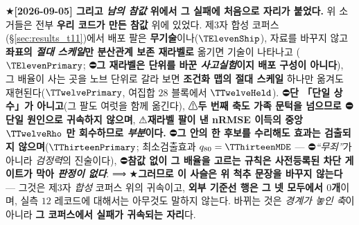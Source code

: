 \documentclass[11pt]{report}
\numberwithin{equation}{chapter}
\numberwithin{figure}{chapter}
\numberwithin{table}{chapter}
\begin{document}
★\textbf{[2026-09-05] 그리고 \emph{남의 참값} 위에서 그 실패에 처음으로 자리가 붙었다.}
위 소거들은 전부 \textbf{우리 코드가 만든 참값} 위에 있었다. 제3자 합성 코퍼스
(\S\ref{sec:results_t11})에서 배포 팔은 \textbf{무기술}이나($\TElevenShip$), 자료를 바꾸지
않고 \textbf{좌표의 \emph{절대 스케일}만 분산관계 보존 재라벨로} 옮기면 기술이 나타나고
($\TElevenPrimary$; ⛔\textbf{그 재라벨은 단위를 바꾼 \emph{사고실험}이지 배포
구성이 아니다}), 그 배율이 사는 곳을 노브 단위로 갈라 보면 \textbf{조건화 맵의 절대
스케일} 하나만 옮겨도 재현된다($\TTwelvePrimary$, 여집합 $28$ 블록에서 $\TTwelveHeld$).
⛔\textbf{단 「단일 상수」가 아니고}(그 팔도 여럿을 함께 옮긴다), ⚠\textbf{두 번째 축도
가족 문턱을 넘으므로 ⛔단일 원인으로 귀속하지 않으며}, ⚠\textbf{재라벨 팔이 낸 nRMSE
이득의 중앙 $\TTwelveRho$ 만 회수하므로 \emph{부분}이다.}
⛔\textbf{그 안의 한
후보를 수리해도 효과는 검출되지 않으며}($\TThirteenPrimary$; 최소검출효과
$q_{80} = \TThirteenMDE$ --- ⛔\emph{``무죄''}가 아니라 \emph{검정력}의 진술이다), ⛔\textbf{참값 없이 그 배율을 고르는 규칙은 사전등록된
차단 게이트가 막아 \emph{판정이 없다}}.
⟹ ★\textbf{그러므로 이 사슬은 위 척추 문장을 바꾸지 않는다} --- 그것은 제3자
\emph{합성} 코퍼스 위의 귀속이고, \textbf{외부 기준선 행은 그 넷 모두에서 $0$개}이며,
실측 $12$ 레코드에 대해서는 아무것도 말하지 않는다. 바뀌는 것은 \emph{경계가 놓인 축}이
아니라 \textbf{그 코퍼스에서 실패가 귀속되는 자리}다.
\end{document}
